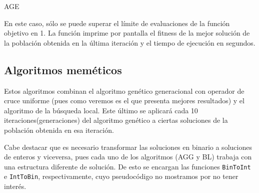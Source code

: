 \documentclass[10pt,a4paper]{article}
\begin{document}
\begin{algorithm}[H]
	\DontPrintSemicolon
	\caption{{\sc AGE}}
\end{algorithm}

En este caso, sólo se puede superar el límite de evaluaciones de la función objetivo en 1. La función imprime por pantalla el fitness de la mejor solución de la población obtenida en la última iteración y el tiempo de ejecución en segundos. 

\subsection{Algoritmos meméticos}

Estos algoritmos combinan el algoritmo genético generacional con operador de cruce uniforme (pues como veremos es el que presenta mejores resultados) y el algoritmo de la búsqueda local. Este último se aplicará cada 10 iteraciones(generaciones) del algoritmo genético a ciertas soluciones de la población obtenida en esa iteración. 

Cabe destacar que es necesario transformar las soluciones en binario a soluciones de enteros y viceversa, pues cada uno de los algoritmos (AGG y BL) trabaja con una estructura diferente de solución. De esto se encargan las funciones \lstinline|BinToInt| e \lstinline|IntToBin|, respectivamente, cuyo pseudocódigo no mostramos por no tener interés. 
\end{document}
